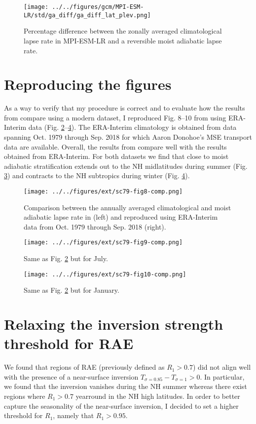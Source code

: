 \documentclass[11pt]{article}
\begin{document}
\begin{figure}[htbp]
\centering
\texttt{[image: ../../figures/gcm/MPI-ESM-LR/std/ga\_diff/ga\_diff\_lat\_plev.png]}
\caption{\label{fig:org77bd9bf}Percentage difference between the zonally averaged climatological lapse rate in MPI-ESM-LR and a reversible moist adiabatic lapse rate.}
\end{figure}

\section{Reproducing the \cite{stone1979} figures}
\label{sec:orgb9af566}
As a way to verify that my procedure is correct and to evaluate how the results from \cite{stone1979} compare using a modern dataset, I reproduced Fig. 8--10 from \cite{stone1979} using ERA-Interim data (Fig. \ref{fig:orgaf7c689}--\ref{fig:org87d79ec}). The ERA-Interim climatology is obtained from data spanning Oct. 1979 through Sep. 2018 for which Aaron Donohoe's MSE transport data are available. Overall, the results from \cite{stone1979} compare well with the results obtained from ERA-Interim. For both datasets we find that close to moist adiabatic stratification extends out to the NH midlatitudes during summer (Fig. \ref{fig:org2f02c30}) and contracts to the NH subtropics during winter (Fig. \ref{fig:org87d79ec}).

\begin{figure}[htbp]
\centering
\texttt{[image: ../../figures/ext/sc79-fig8-comp.png]}
\caption{\label{fig:orgaf7c689}Comparison between the annually averaged climatological and moist adiabatic lapse rate in \cite{stone1979} (left) and reproduced using ERA-Interim data from Oct. 1979 through Sep. 2018 (right).}
\end{figure}

\begin{figure}[htbp]
\centering
\texttt{[image: ../../figures/ext/sc79-fig9-comp.png]}
\caption{\label{fig:org2f02c30}Same as Fig. \ref{fig:orgaf7c689} but for July.}
\end{figure}

\begin{figure}[htbp]
\centering
\texttt{[image: ../../figures/ext/sc79-fig10-comp.png]}
\caption{\label{fig:org87d79ec}Same as Fig. \ref{fig:orgaf7c689} but for January.}
\end{figure}

\section{Relaxing the inversion strength threshold for RAE}
\label{sec:org792a68a}
We found that regions of RAE (previously defined as \(R_1>0.7\)) did not align well with the presence of a near-surface inversion \(T_{\sigma=0.85}-T_{\sigma=1} > 0\). In particular, we found that the inversion vanishes during the NH summer whereas there exist regions where \(R_1>0.7\) yearround in the NH high latitudes. In order to better capture the seasonality of the near-surface inversion, I decided to set a higher threshold for \(R_1\), namely that \(R_1>0.95\).
\end{document}
